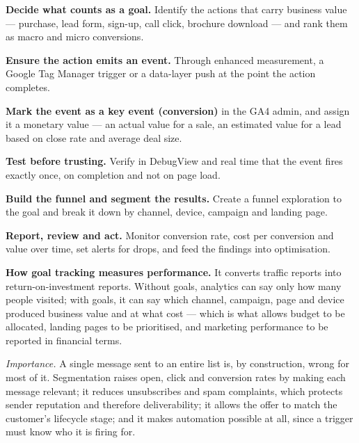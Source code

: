 \begin{qlist}
\begin{apts}
\item \textbf{Decide what counts as a goal.} Identify the actions that carry
      business value --- purchase, lead form, sign-up, call click, brochure
      download --- and rank them as macro and micro conversions.
\item \textbf{Ensure the action emits an event.} Through enhanced measurement,
      a Google Tag Manager trigger or a data-layer push at the point the action
      completes.
\item \textbf{Mark the event as a key event (conversion)} in the GA4 admin, and
      assign it a monetary value --- an actual value for a sale, an estimated
      value for a lead based on close rate and average deal size.
\item \textbf{Test before trusting.} Verify in DebugView and real time that the
      event fires exactly once, on completion and not on page load.
\item \textbf{Build the funnel and segment the results.} Create a funnel
      exploration to the goal and break it down by channel, device, campaign and
      landing page.
\item \textbf{Report, review and act.} Monitor conversion rate, cost per
      conversion and value over time, set alerts for drops, and feed the
      findings into optimisation.
\end{apts}

\textbf{How goal tracking measures performance.} It converts traffic reports
into return-on-investment reports. Without goals, analytics can say only how
many people visited; with goals, it can say which channel, campaign, page and
device produced business value and at what cost --- which is what allows budget
to be allocated, landing pages to be prioritised, and marketing performance to
be reported in financial terms.

\textit{Importance.} A single message sent to an entire list is, by
construction, wrong for most of it. Segmentation raises open, click and
conversion rates by making each message relevant; it reduces unsubscribes and
spam complaints, which protects sender reputation and therefore deliverability;
it allows the offer to match the customer's lifecycle stage; and it makes
automation possible at all, since a trigger must know who it is firing for.


\end{qlist}
